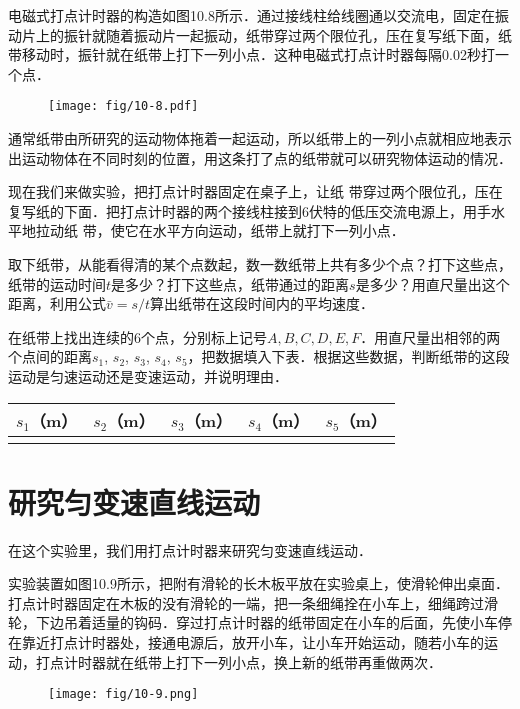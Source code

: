 电磁式打点计时器的构造如图10.8所示．通过接线柱给线圈通以交流电，固定在振动片上的振针就随着振动片一起振动，纸带穿过两个限位孔，压在复写纸下面，纸带移动时，振针就在纸带上打下一列小点．这种电磁式打点计时器每隔0.02秒打一个点．
\begin{figure}[htp]
    \centering
    \texttt{[image: fig/10-8.pdf]}
    \caption{}
\end{figure}

通常纸带由所研究的运动物体拖着一起运动，所以纸带上的一列小点就相应地表示出运动物体在不同时刻的位置，用这条打了点的纸带就可以研究物体运动的情况．

现在我们来做实验，把打点计时器固定在桌子上，让纸
带穿过两个限位孔，压在复写纸的下面．把打点计时器的两个接线柱接到6伏特的低压交流电源上，用手水平地拉动纸	
带，使它在水平方向运动，纸带上就打下一列小点．

取下纸带，从能看得清的某个点数起，数一数纸带上共有多少个点？打下这些点，纸带的运动时间$t$是多少？打下这些点，纸带通过的距离$s$是多少？用直尺量出这个距离，利用公式$\bar v=s/t$算出纸带在这段时间内的平均速度．

在纸带上找出连续的6个点，分别标上记号$A,B,C,D,E,F$．用直尺量出相邻的两个点间的距离$s_1$, $s_2$, $s_3$, $s_4$, $s_5$，把数据填入下表．根据这些数据，判断纸带的这段运动是匀速运动还是变速运动，并说明理由．
\begin{center}
    \begin{tabular}{c|c|c|c|c}
        \hline
        $s_1$（m）&$s_2$（m）&$s_3$（m）&$s_4$（m）&$s_5$（m）\\
        \hline
&&&&\\
        \hline
    \end{tabular}
\end{center}

\section{研究匀变速直线运动}
在这个实验里，我们用打点计时器来研究匀变速直线运动．

实验装置如图10.9所示，把附有滑轮的长木板平放在实验桌上，使滑轮伸出桌面．打点计时器固定在木板的没有滑轮的一端，把一条细绳拴在小车上，细绳跨过滑轮，下边吊着适量的钩码．穿过打点计时器的纸带固定在小车的后面，先使小车停在靠近打点计时器处，接通电源后，放开小车，让小车开始运动，随若小车的运动，打点计时器就在纸带上打下一列小点，换上新的纸带再重做两次．	
\begin{figure}[htp]
    \centering
    \texttt{[image: fig/10-9.png]}
    \caption{}
\end{figure}

